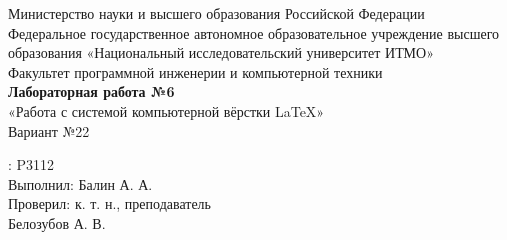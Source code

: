 \begin{center}
    \Large Министерство науки и высшего образования Российской Федерации \\
     Федеральное государственное автономное образовательное учреждение высшего образования «Национальный исследовательский университет ИТМО» \\
     \vspace{18pt}
     Факультет программной инженерии и компьютерной техники\\
     \vspace{84pt}
     \LARGE \textbf {Лабораторная работа №6}\\
     \vspace{8pt}
     \Large «Работа с системой компьютерной вёрстки \LaTeX»\\
     \vspace{30pt}
     Вариант №22\\
     \vspace{160pt}
\end{center}
\begin{flushright}
\begin{minipage}{0.45\textwidth}
    : P3112\\\vspace{8pt}Выполнил: Балин А. А.\\
    Проверил: к. т. н., преподаватель\\Белозубов А. В.\\
\end{minipage}
\end{flushright}

